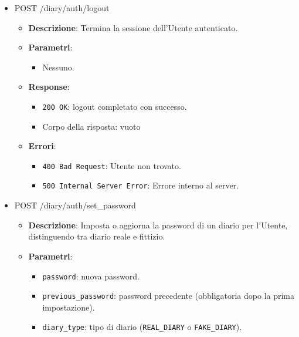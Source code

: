 \documentclass[a4paper,12pt]{article}
\newcommand{\code}[1]{{\ttfamily\textcolor{purple!85!black}{#1}}}
\begin{document}
\begin{itemize}
\item \code{POST /diary/auth/logout}
        \begin{itemize}
            \item \textbf{Descrizione}: Termina la sessione dell’Utente autenticato.

            \item \textbf{Parametri}:
            \begin{itemize}
                \item Nessuno.
            \end{itemize}

            \item \textbf{Response}:
            \begin{itemize}
                \item \texttt{200 OK}: logout completato con successo.
                \item Corpo della risposta: vuoto
            \end{itemize}

            \item \textbf{Errori}:
            \begin{itemize}
                \item \texttt{400 Bad Request}: Utente non trovato.
                \item \texttt{500 Internal Server Error}: Errore interno al server.
            \end{itemize}
        \end{itemize}

\item \code{POST /diary/auth/set\_password}
        \begin{itemize}
            \item \textbf{Descrizione}: Imposta o aggiorna la password di un diario per l’Utente, distinguendo tra diario reale e fittizio.

            \item \textbf{Parametri}:
            \begin{itemize}
                \item \texttt{password}: nuova password.
                \item \texttt{previous\_password}: password precedente (obbligatoria dopo la prima impostazione).
                \item \texttt{diary\_type}: tipo di diario (\texttt{REAL\_DIARY} o \texttt{FAKE\_DIARY}).
            \end{itemize}


\end{itemize}
\end{itemize}
\end{document}
